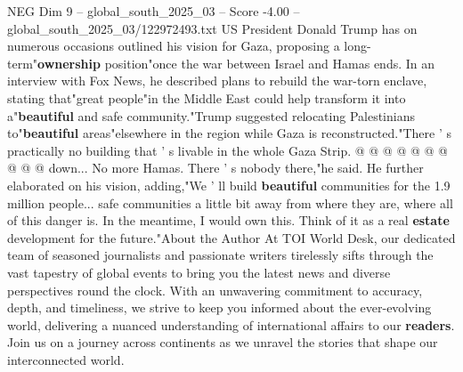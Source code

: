 \begin{textsample}{NEG Dim 9 – global\_south\_2025\_03 – Score -4.00 – global\_south\_2025\_03/122972493.txt}
US President Donald Trump has on numerous occasions outlined his vision for Gaza, proposing a long-term"\textbf{ownership} position"once the war between Israel and Hamas ends.
In an interview with Fox News, he described plans to rebuild the war-torn enclave, stating that"great people"in the Middle East could help transform it into a"\textbf{beautiful} and safe community."Trump suggested relocating Palestinians to"\textbf{beautiful} areas"elsewhere in the region while Gaza is reconstructed."There ' s practically no building that ' s livable in the whole Gaza Strip. @ @ @ @ @ @ @ @ @ @ down...
No more Hamas.
There ' s nobody there,"he said.
He further elaborated on his vision, adding,"We ' ll build \textbf{beautiful} communities for the 1.9 million people... safe communities a little bit away from where they are, where all of this danger is.
In the meantime, I would own this.
Think of it as a real \textbf{estate} development for the future."About the Author At TOI World Desk, our dedicated team of seasoned journalists and passionate writers tirelessly sifts through the vast tapestry of global events to bring you the latest news and diverse perspectives round the clock.
With an unwavering commitment to accuracy, depth, and timeliness, we strive to keep you informed about the ever-evolving world, delivering a nuanced understanding of international affairs to our \textbf{readers}.
Join us on a journey across continents as we unravel the stories that shape our interconnected world.

\end{textsample}
